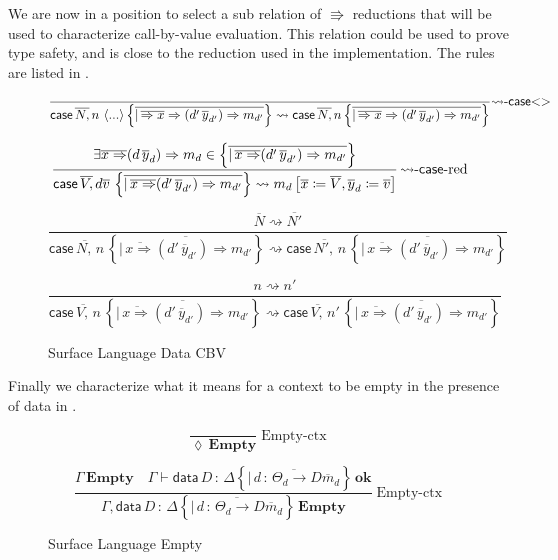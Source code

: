 We are now in a position to select a sub relation of $\Rrightarrow$ reductions that will be used to characterize call-by-value evaluation.
This relation could be used to prove type safety, and is close to the reduction used in the implementation.
The rules are listed in .

\begin{figure}
\[
\frac{\,}{\mathsf{case}\,\overline{N,}\,n\,\left\langle ...\right\rangle \left\{ \overline{|\,\overline{\Rightarrow x}\Rightarrow(d'\,\overline{y}_{d'})\Rightarrow m_{d'}}\right\} \rightsquigarrow\mathsf{case}\,\overline{N,}\,n\left\{ \overline{|\,\overline{\Rightarrow x}\Rightarrow(d'\,\overline{y}_{d'})\Rightarrow m_{d'}}\right\} }\textrm{\ensuremath{\rightsquigarrow}-\ensuremath{\mathsf{case}}<>}
\]

\[
\frac{\exists\overline{x\Rightarrow}(d\,\overline{y}_{d})\Rightarrow m_{d}\in\left\{ \overline{|\,\overline{x\Rightarrow}(d'\,\overline{y}_{d'})\Rightarrow m_{d'}}\right\} }{\mathsf{case}\,\overline{V,}\,d\overline{v}\,\left\{ \overline{|\,\overline{x\Rightarrow}(d'\,\overline{y}_{d'})\Rightarrow m_{d'}}\right\} \rightsquigarrow m_{d}\left[\overline{x}\coloneqq\overline{V},\overline{y}_{d}\coloneqq\overline{v}\right]}\,\textrm{\ensuremath{\rightsquigarrow}-\ensuremath{\mathsf{case}}-red}
\]

\[
\frac{\overline{N}\rightsquigarrow\overline{N'}}{\mathsf{case}\,\overline{N,}\,n\,\left\{ \overline{|\,\overline{x\Rightarrow}(d'\,\overline{y}_{d'})\Rightarrow m_{d'}}\right\} \rightsquigarrow\mathsf{case}\,\overline{N',}\,n\,\left\{ \overline{|\,\overline{x\Rightarrow}(d'\,\overline{y}_{d'})\Rightarrow m_{d'}}\right\} }\,
\]

\[
\frac{n\rightsquigarrow n'}{\mathsf{case}\,\overline{V,}\,n\,\left\{ \overline{|\,\overline{x\Rightarrow}(d'\,\overline{y}_{d'})\Rightarrow m_{d'}}\right\} \rightsquigarrow\mathsf{case}\,\overline{V,}\,n'\,\left\{ \overline{|\,\overline{x\Rightarrow}(d'\,\overline{y}_{d'})\Rightarrow m_{d'}}\right\} }\,
\]

\caption{Surface Language Data CBV}
\label{fig:surface-data-cbv}
\end{figure}


Finally we characterize what it means for a context to be empty in the presence of data in .

\begin{figure}
\[
\frac{\ }{\lozenge\,\mathbf{Empty}}\operatorname{Empty-ctx}
\]

\[
\frac{\Gamma\,\mathbf{Empty}\quad\Gamma\vdash\mathsf{data}\,D\,:\,\Delta\left\{ \overline{|\,d\,:\,\varTheta_{d}\rightarrow D\overline{m}_{d}}\right\} \,\mathbf{ok}}{\Gamma,\mathsf{data}\,D\,:\,\Delta\left\{ \overline{|\,d\,:\,\varTheta_{d}\rightarrow D\overline{m}_{d}}\right\} \,\mathbf{Empty}}\operatorname{Empty-ctx}
\]

\caption{Surface Language Empty}
\label{fig:surface-data-empty}
\end{figure}

